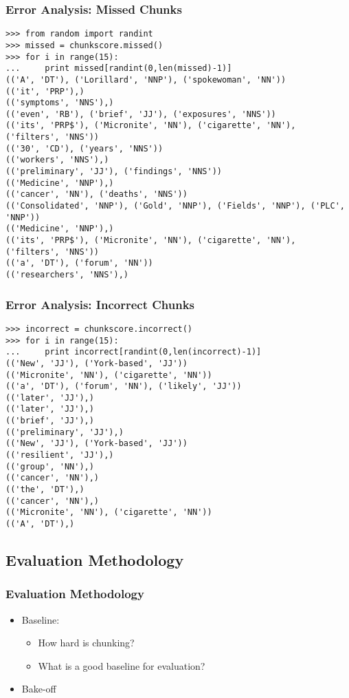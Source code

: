 \documentclass{beamer}             %
\begin{document}
\begin{frame}[fragile]
  \frametitle{Error Analysis: Missed Chunks}
  \scriptsize

\begin{verbatim}
>>> from random import randint
>>> missed = chunkscore.missed()
>>> for i in range(15):
...     print missed[randint(0,len(missed)-1)]
(('A', 'DT'), ('Lorillard', 'NNP'), ('spokewoman', 'NN'))
(('it', 'PRP'),)
(('symptoms', 'NNS'),)
(('even', 'RB'), ('brief', 'JJ'), ('exposures', 'NNS'))
(('its', 'PRP$'), ('Micronite', 'NN'), ('cigarette', 'NN'), ('filters', 'NNS'))
(('30', 'CD'), ('years', 'NNS'))
(('workers', 'NNS'),)
(('preliminary', 'JJ'), ('findings', 'NNS'))
(('Medicine', 'NNP'),)
(('cancer', 'NN'), ('deaths', 'NNS'))
(('Consolidated', 'NNP'), ('Gold', 'NNP'), ('Fields', 'NNP'), ('PLC', 'NNP'))
(('Medicine', 'NNP'),)
(('its', 'PRP$'), ('Micronite', 'NN'), ('cigarette', 'NN'), ('filters', 'NNS'))
(('a', 'DT'), ('forum', 'NN'))
(('researchers', 'NNS'),)
\end{verbatim}
\end{frame}

\begin{frame}[fragile]
  \frametitle{Error Analysis: Incorrect Chunks}
  \scriptsize

\begin{verbatim}
>>> incorrect = chunkscore.incorrect()
>>> for i in range(15):
...     print incorrect[randint(0,len(incorrect)-1)]
(('New', 'JJ'), ('York-based', 'JJ'))
(('Micronite', 'NN'), ('cigarette', 'NN'))
(('a', 'DT'), ('forum', 'NN'), ('likely', 'JJ'))
(('later', 'JJ'),)
(('later', 'JJ'),)
(('brief', 'JJ'),)
(('preliminary', 'JJ'),)
(('New', 'JJ'), ('York-based', 'JJ'))
(('resilient', 'JJ'),)
(('group', 'NN'),)
(('cancer', 'NN'),)
(('the', 'DT'),)
(('cancer', 'NN'),)
(('Micronite', 'NN'), ('cigarette', 'NN'))
(('A', 'DT'),)
\end{verbatim}
\end{frame}

\subsection{Evaluation Methodology}

\begin{frame}
  \frametitle{Evaluation Methodology}
  \begin{itemize}
  \item Baseline:
    \begin{itemize}
    \item How hard is chunking?
    \item What is a good baseline for evaluation?
    \end{itemize}
  \item Bake-off
  \end{itemize}
\end{frame}
\end{document}
